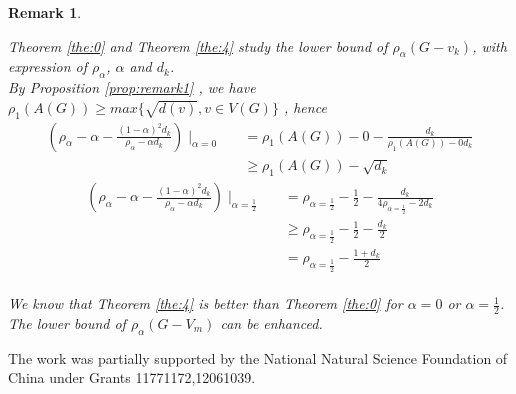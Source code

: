 \documentclass[amsthm]{elsart}
\newtheorem{remark}{Remark}[section]
\begin{document}
\begin{remark} \label{remark:2}

Theorem \ref{the:0} and Theorem \ref{the:4} study the lower bound of $\rho_\alpha(G-v_k)$, with expression of $\rho_\alpha$, $\alpha$ and $d_k$.
\\ By Proposition \ref{prop:remark1} , we have
$ \rho_1(A(G)) \geqslant max \{ \sqrt{d(v)},  v \in V(G)  \} $ , hence
\begin{eqnarray*}
(\rho _\alpha - \alpha - \frac{(1 - \alpha)^2 d_k}{\rho _\alpha - \alpha d_k}) \mid _{\alpha = 0}
 && = \rho _1(A(G)) - 0 - \frac{ d_k}{ \rho _1(A(G)) - 0 d_k}
\\ && \geqslant \rho _1(A(G)) - \sqrt{d_k}
\end{eqnarray*}
 \begin{eqnarray*}
 (\rho _\alpha - \alpha - \frac{(1 - \alpha)^2 d_k}{\rho _\alpha - \alpha d_k}) \mid _{\alpha = \frac{1}{2}}
 && = \rho _{\alpha = \frac{1}{2}} - \frac{1}{2} - \frac{ d_k}{4 \rho _{\alpha = \frac{1}{2}} - 2 d_k}
\\ && \geqslant \rho _{\alpha = \frac{1}{2}} - \frac{1}{2} - \frac{ d_k}{2}
\\ && = \rho _{\alpha = \frac{1}{2}} - \frac{1 + d_k}{2}
\end{eqnarray*}
\\ We know that Theorem \ref{the:4} is better than Theorem \ref{the:0} for $\alpha = 0$ or $\alpha = \frac{1}{2}$.
\\ The lower bound of $\rho_\alpha(G-V_m)$ can be enhanced.

\end{remark}

\vskip4mm


 The work was partially supported by the National Natural Science Foundation of China under Grants 11771172,12061039.
\end{document}
